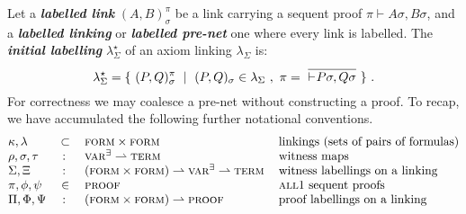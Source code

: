 \documentclass[UKenglish]{lipics-v2016}
\theoremstyle{plain}
\newcommand\defn[1]{\textit{\textbf{#1}}}
\newcommand\varE{\textsc{var}^\exists}
\newcommand\terms{\textsc{term}}
\newcommand\form{\textsc{form}}
\newcommand\proofs{\textsc{proof}}
\newcommand\all{\textsc{all}}
\newcommand\+{+}
\renewcommand\*{\times}
\newcommand\seq[3][]{{\vdash_{#1}}#2,#3}
\newcommand\prf[3]{#1\vdash\!#2,#3}
\newcommand\link[3][\sigma]{(#2,#3)_{#1}}
\begin{document}
Let a \defn{labelled link} $\link AB^\pi$ be a link carrying a sequent proof $\prf\pi{A\sigma}{B\sigma}$, and a \defn{labelled linking} or \defn{labelled pre-net} one where every link is labelled. The \defn{initial labelling} $\lambda_\Sigma^\star$ of an axiom linking $\lambda_\Sigma$ is:
\[
	\lambda_\Sigma^\star = \{~\link PQ^\pi~\mid~\link PQ\in\lambda_\Sigma~,~\pi=~\infer{\seq{P\sigma}{Q\sigma}}{}~\}~.
\]
For correctness we may coalesce a pre-net without constructing a proof. 
%
To recap, we have accumulated the following further notational conventions.
%
\[
\begin{tabular}{@{}lcll@{}}
	$\kappa,\lambda$ 	& $\subset$ & $\form\times\form$ 	& linkings (sets of pairs of formulas)\\
	$\rho,\sigma,\tau$	& $\colon$  & $\varE\rightharpoonup\terms$ & witness maps\\
	$\Sigma,\Xi$		& $\colon$  & $(\form\times\form)\rightharpoonup\varE\rightharpoonup\terms$		& witness labellings on a linking \\
	$\pi,\phi,\psi$		& $\in$ & $\proofs$ & \all1 sequent proofs\\
	$\Pi,\Phi,\Psi$		& $\colon$  & $(\form\times\form)\rightharpoonup\proofs$		& proof labellings on a linking
\end{tabular}
\]
\end{document}

